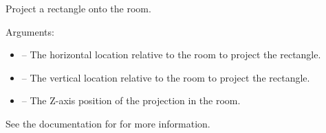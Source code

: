 \documentclass[letterpaper,10pt,english]{sphinxmanual}
\begin{document}

\begin{fulllineitems}
\label{dsp:sge.dsp.Room.project_rectangle}
Project a rectangle onto the room.

Arguments:
\begin{itemize}
\item {} 
 -- The horizontal location relative to the room to
project the rectangle.

\item {} 
 -- The vertical location relative to the room to project
the rectangle.

\item {} 
 -- The Z-axis position of the projection in the room.

\end{itemize}

See the documentation for {\hyperref[gfx:sge.gfx.Sprite.draw_rectangle]{\emph{}}}
for more information.

\end{fulllineitems}

\end{document}
